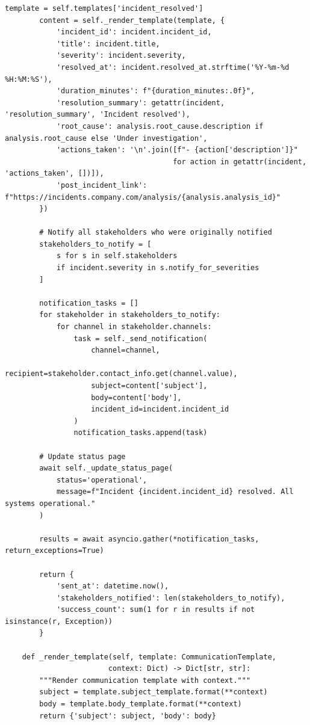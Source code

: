 \begin{lstlisting}[style=python, caption={Incident communication with multi-channel notifications}]
        template = self.templates['incident_resolved']
        content = self._render_template(template, {
            'incident_id': incident.incident_id,
            'title': incident.title,
            'severity': incident.severity,
            'resolved_at': incident.resolved_at.strftime('%Y-%m-%d %H:%M:%S'),
            'duration_minutes': f"{duration_minutes:.0f}",
            'resolution_summary': getattr(incident, 'resolution_summary', 'Incident resolved'),
            'root_cause': analysis.root_cause.description if analysis.root_cause else 'Under investigation',
            'actions_taken': '\n'.join([f"- {action['description']}"
                                       for action in getattr(incident, 'actions_taken', [])]),
            'post_incident_link': f"https://incidents.company.com/analysis/{analysis.analysis_id}"
        })

        # Notify all stakeholders who were originally notified
        stakeholders_to_notify = [
            s for s in self.stakeholders
            if incident.severity in s.notify_for_severities
        ]

        notification_tasks = []
        for stakeholder in stakeholders_to_notify:
            for channel in stakeholder.channels:
                task = self._send_notification(
                    channel=channel,
                    recipient=stakeholder.contact_info.get(channel.value),
                    subject=content['subject'],
                    body=content['body'],
                    incident_id=incident.incident_id
                )
                notification_tasks.append(task)

        # Update status page
        await self._update_status_page(
            status='operational',
            message=f"Incident {incident.incident_id} resolved. All systems operational."
        )

        results = await asyncio.gather(*notification_tasks, return_exceptions=True)

        return {
            'sent_at': datetime.now(),
            'stakeholders_notified': len(stakeholders_to_notify),
            'success_count': sum(1 for r in results if not isinstance(r, Exception))
        }

    def _render_template(self, template: CommunicationTemplate,
                        context: Dict) -> Dict[str, str]:
        """Render communication template with context."""
        subject = template.subject_template.format(**context)
        body = template.body_template.format(**context)
        return {'subject': subject, 'body': body}


\end{lstlisting}
